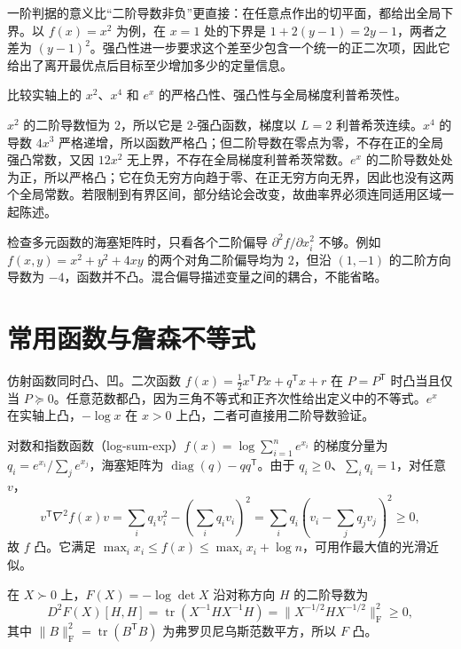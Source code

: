\documentclass[UTF8,12pt,a4paper,fontset=fandol]{ctexbook}
\begin{document}
一阶判据的意义比“二阶导数非负”更直接：在任意点作出的切平面，都给出全局下界。以 $f(x)=x^2$ 为例，在 $x=1$ 处的下界是 $1+2(y-1)=2y-1$，两者之差为 $(y-1)^2$。强凸性进一步要求这个差至少包含一个统一的正二次项，因此它给出了离开最优点后目标至少增加多少的定量信息。

\begin{example}[三个容易混淆的曲率性质]
比较实轴上的 $x^2$、$x^4$ 和 $e^x$ 的严格凸性、强凸性与全局梯度利普希茨性。
\end{example}
\begin{solve}
$x^2$ 的二阶导数恒为 $2$，所以它是 $2$-强凸函数，梯度以 $L=2$ 利普希茨连续。$x^4$ 的导数 $4x^3$ 严格递增，所以函数严格凸；但二阶导数在零点为零，不存在正的全局强凸常数，又因 $12x^2$ 无上界，不存在全局梯度利普希茨常数。$e^x$ 的二阶导数处处为正，所以严格凸；它在负无穷方向趋于零、在正无穷方向无界，因此也没有这两个全局常数。若限制到有界区间，部分结论会改变，故曲率界必须连同适用区域一起陈述。
\end{solve}

检查多元函数的海塞矩阵时，只看各个二阶偏导 $\partial^2 f/\partial x_i^2$ 不够。例如 $f(x,y)=x^2+y^2+4xy$ 的两个对角二阶偏导均为 $2$，但沿 $(1,-1)$ 的二阶方向导数为 $-4$，函数并不凸。混合偏导描述变量之间的耦合，不能省略。

\section{常用函数与詹森不等式}

仿射函数同时凸、凹。二次函数 $f(x)=\tfrac12x^{\mathsf T}Px+q^{\mathsf T}x+r$ 在 $P=P^{\mathsf T}$ 时凸当且仅当 $P\succeq0$。任意范数都凸，因为三角不等式和正齐次性给出定义中的不等式。$e^x$ 在实轴上凸，$-\log x$ 在 $x>0$ 上凸，二者可直接用二阶导数验证。

对数和指数函数（log-sum-exp）$f(x)=\log\sum_{i=1}^n e^{x_i}$ 的梯度分量为 $q_i=e^{x_i}/\sum_j e^{x_j}$，海塞矩阵为 $\operatorname{diag}(q)-qq^{\mathsf T}$。由于 $q_i\geq0$、$\sum_iq_i=1$，对任意 $v$，
\[
 v^{\mathsf T}\nabla^2f(x)v
 =\sum_iq_i v_i^2-\left(\sum_iq_i v_i\right)^2
 =\sum_iq_i\left(v_i-\sum_jq_jv_j\right)^2\geq0,
\]
故 $f$ 凸。它满足 $\max_i x_i\leq f(x)\leq\max_i x_i+\log n$，可用作最大值的光滑近似。

在 $X\succ0$ 上，$F(X)=-\log\det X$ 沿对称方向 $H$ 的二阶导数为
\[
 D^2F(X)[H,H]=\operatorname{tr}(X^{-1}HX^{-1}H)
 =\|X^{-1/2}HX^{-1/2}\|_{\mathrm F}^2\geq0,
\]
其中 $\|B\|_{\mathrm F}^2=\operatorname{tr}(B^{\mathsf T}B)$ 为弗罗贝尼乌斯范数平方，所以 $F$ 凸。
\end{document}
